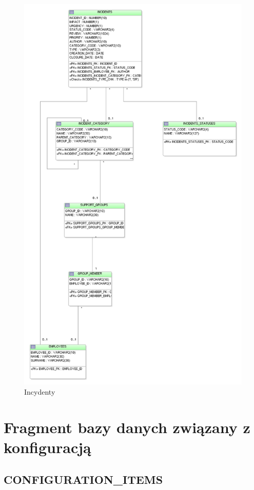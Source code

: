 \documentclass[a4paper, oneside, 11pt]{report}
\begin{document}
\begin{figure}[!ht]
\centering
\includegraphics[width=14cm]{incydenty.png}
\caption{Incydenty}
\end{figure}


\section{Fragment bazy danych związany z konfiguracją}

\subsection{CONFIGURATION\_ITEMS}
\end{document}

